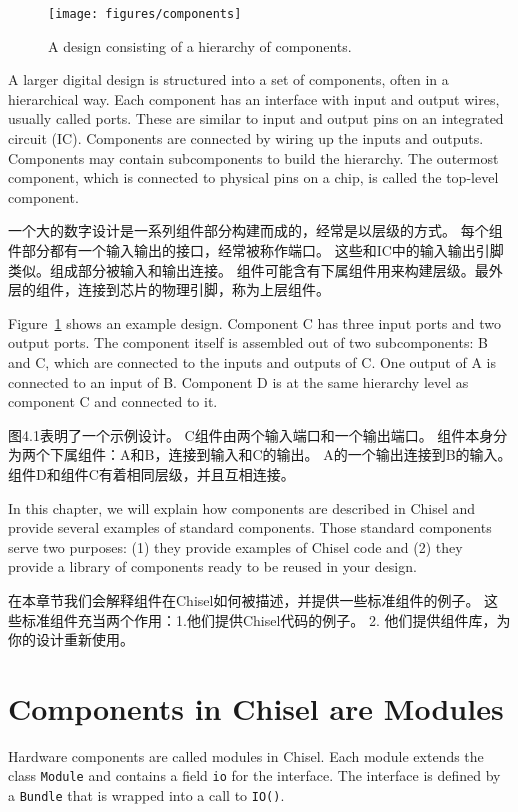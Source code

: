 \documentclass[%
    10pt,
    headinclude, footexclude,
    openright, %
    notitlepage,
    cleardoubleempty,
    headsepline,
    pointlessnumbers,
    bibtotoc, idxtotoc,
    ]{scrbook}
\newcommand{\code}[1]{{\small{\texttt{#1}}}}
\newcommand{\scale}{0.7}
\begin{document}
\begin{figure}
  \centering
  \texttt{[image: figures/components]}
  \caption{A design consisting of a hierarchy of components.}
  \label{fig:components}
\end{figure}


A larger digital design is structured into a set of components, often in
a hierarchical way. Each component has an interface with input and output
wires, usually called ports. These are similar to input and output pins on an integrated circuit (IC).
Components are connected by wiring up the inputs and outputs.
Components may contain subcomponents to build the hierarchy.
The outermost component, which is connected to physical pins
on a chip, is called the top-level component.

一个大的数字设计是一系列组件部分构建而成的，经常是以层级的方式。
每个组件部分都有一个输入输出的接口，经常被称作端口。
这些和IC中的输入输出引脚类似。组成部分被输入和输出连接。
组件可能含有下属组件用来构建层级。最外层的组件，连接到芯片的物理引脚，称为上层组件。

Figure~\ref{fig:components} shows an example design. Component C has
three input ports and two output ports. The component itself is assembled out
of two subcomponents: B and C, which are connected to the inputs and
outputs of C. One output of A is connected to an input of B.
Component D is at the same hierarchy level as component C and connected
to it.

图4.1表明了一个示例设计。
C组件由两个输入端口和一个输出端口。
组件本身分为两个下属组件：A和B，连接到输入和C的输出。
A的一个输出连接到B的输入。
组件D和组件C有着相同层级，并且互相连接。


In this chapter, we will explain how components are described in Chisel and
provide several examples of standard components.
Those standard components serve two purposes: (1) they provide examples
of Chisel code and (2) they provide a library of components ready to be reused
in your design.

在本章节我们会解释组件在Chisel如何被描述，并提供一些标准组件的例子。
这些标准组件充当两个作用：1.他们提供Chisel代码的例子。
2. 他们提供组件库，为你的设计重新使用。

\section{Components in Chisel are Modules}

Hardware components are called modules in Chisel. Each module extends
the class \code{Module} and contains a field \code{io} for the interface.
The interface is defined by a \code{Bundle} that is wrapped into a call to \code{IO()}.
\end{document}
